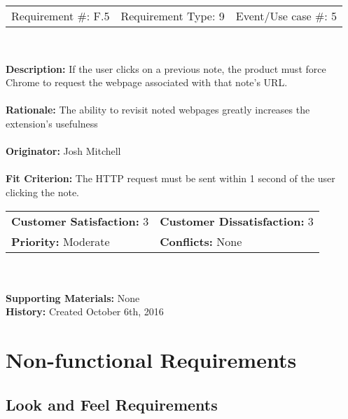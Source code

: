 \documentclass[12pt, titlepage]{article}
\begin{document}
\begin{framed}
	
	\begin{center}
		
		\begin{tabular}{ l c r }
			Requirement \#: F.5 & Requirement Type: 9 & Event/Use case \#: 5\\
		\end{tabular} \\
	\end{center}
	\textbf{Description:} If the user clicks on a previous note, the product 
	must force Chrome to request the webpage associated with that note's URL.\\
	\\
	\textbf{Rationale:} The ability to revisit noted webpages greatly increases 
	the extension's usefulness \\
	\\
	\textbf{Originator:} Josh Mitchell \\
	\\
	\textbf{Fit Criterion:} The HTTP request must be sent within 1 second of 
	the user clicking the note. \\
	
	\begin{tabular}{ll}
		\textbf{Customer Satisfaction:} 3 & \textbf{Customer Dissatisfaction:} 
		3 \\
		\textbf{Priority:} Moderate & \textbf{Conflicts:} None\\
	\end{tabular} \\
	\\
	\textbf{Supporting Materials:} None \\
	\textbf{History:} Created October 6th, 2016
	
\end{framed}

\section{Non-functional Requirements}

\subsection{Look and Feel Requirements}
\end{document}
